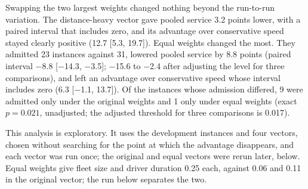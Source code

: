 Swapping the two largest weights changed nothing beyond the run-to-run variation. The distance-heavy vector gave pooled service 3.2 points lower, with a paired interval that includes zero, and its advantage over conservative speed stayed clearly positive (12.7 [5.3, 19.7]). Equal weights changed the most. They admitted 23 instances against 31, lowered pooled service by 8.8 points (paired interval $-$8.8 [$-$14.3, $-$3.5]; $-$15.6 to $-$2.4 after adjusting the level for three comparisons), and left an advantage over conservative speed whose interval includes zero (6.3 [$-$1.1, 13.7]). Of the instances whose admission differed, 9 were admitted only under the original weights and 1 only under equal weights (exact $p=0.021$, unadjusted; the adjusted threshold for three comparisons is 0.017).

This analysis is exploratory. It uses the development instances and four vectors, chosen without searching for the point at which the advantage disappears, and each vector was run once; the original and equal vectors were rerun later, below. Equal weights give fleet size and driver duration 0.25 each, against 0.06 and 0.11 in the original vector; the run below separates the two.
